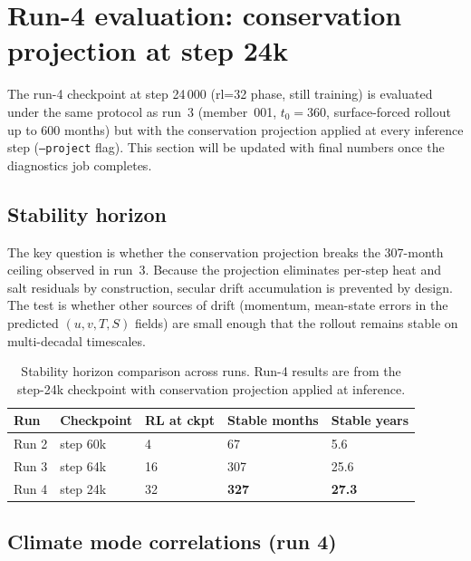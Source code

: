 \documentclass[11pt]{article}
\begin{document}
\section{Run-4 evaluation: conservation projection at step 24k}
\label{sec:run4}

The run-4 checkpoint at step 24\,000 (rl=32 phase, still training) is evaluated
under the same protocol as run~3 (member~001, $t_0=360$, surface-forced rollout
up to 600 months) but with the conservation projection applied at every inference
step (\texttt{--project} flag). This section will be updated with final numbers
once the diagnostics job completes.

\subsection{Stability horizon}
\label{sec:run4stab}

The key question is whether the conservation projection breaks the 307-month
ceiling observed in run~3. Because the projection eliminates per-step heat and
salt residuals by construction, secular drift accumulation is prevented by design.
The test is whether other sources of drift (momentum, mean-state errors in the
predicted $(u,v,T,S)$ fields) are small enough that the rollout remains stable
on multi-decadal timescales.

\begin{table}[h]
\centering
\caption{Stability horizon comparison across runs. Run-4 results are from the
step-24k checkpoint with conservation projection applied at inference.}
\label{tab:stability}
\begin{tabular}{lllll}
\toprule
Run & Checkpoint & RL at ckpt & Stable months & Stable years \\
\midrule
Run 2 & step 60k & 4  & 67  & 5.6 \\
Run 3 & step 64k & 16 & 307 & 25.6 \\
Run 4 & step 24k & 32 & \textbf{327} & \textbf{27.3} \\
\bottomrule
\end{tabular}
\end{table}

\subsection{Climate mode correlations (run 4)}
\label{sec:run4modes}
\end{document}
